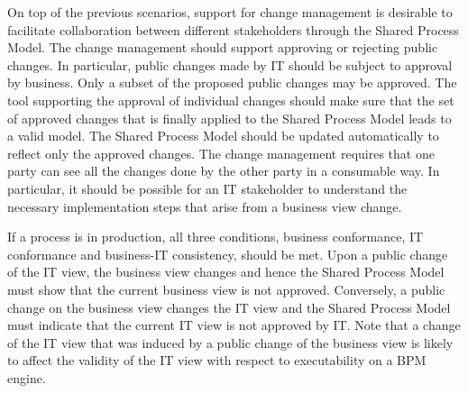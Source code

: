 On top of the previous scenarios, support for change management is desirable to facilitate collaboration between different stakeholders through the Shared Process Model. The change management should support approving or rejecting public changes. In particular, public changes made by IT should be subject to approval by business. Only a subset of the proposed public changes may be approved. The tool supporting the approval of individual changes should make sure that the set of approved changes that is finally applied to the Shared Process Model leads to a valid model. The Shared Process Model should be updated automatically to reflect only the approved changes. The change management requires that one party can see all the changes done by the other party in a consumable way. In particular, it should be possible for an IT stakeholder to understand the necessary implementation steps that arise from a business view change.


If a process is in production, all three conditions, business conformance, IT conformance and business-IT consistency, should be met. Upon a public change of the IT view, the business view changes and hence the Shared Process Model must show that the current business view is not approved. Conversely, a public change on the business view changes the IT view and the Shared Process Model must indicate that the current IT view is not approved by IT. Note that a change of the IT view that was induced by a public change of the business view is likely to affect the validity of the IT view with respect to executability on a BPM engine.
















